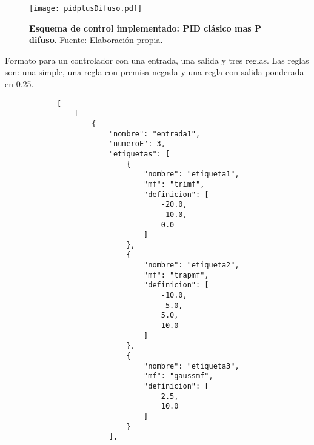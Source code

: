     \vfill

    \begin{figure}[htb]
        \centering
        \texttt{[image: pidplusDifuso.pdf]}
        \caption[Esquema de control implementado: PID clásico más P difuso]{\textbf{Esquema de control implementado: PID clásico mas P difuso}. Fuente: Elaboración propia.} 
        \label{fig:pidplusDifuso}
    \end{figure}
    
    \vfill

    
    \begin{longlisting}
        \caption[Formato para guardar controlador]{Formato para un controlador con una entrada, una salida y tres reglas. Las reglas son: una simple, una regla con premisa negada y una regla con salida ponderada en 0.25.}
        \label{code:anexoE}				
        \begin{verbatim}
            [
                [
                    {
                        "nombre": "entrada1",
                        "numeroE": 3,
                        "etiquetas": [
                            {
                                "nombre": "etiqueta1",
                                "mf": "trimf",
                                "definicion": [
                                    -20.0,
                                    -10.0,
                                    0.0
                                ]
                            },
                            {
                                "nombre": "etiqueta2",
                                "mf": "trapmf",
                                "definicion": [
                                    -10.0,
                                    -5.0,
                                    5.0,
                                    10.0
                                ]
                            },
                            {
                                "nombre": "etiqueta3",
                                "mf": "gaussmf",
                                "definicion": [
                                    2.5,
                                    10.0
                                ]
                            }
                        ],

\end{verbatim}
\end{longlisting}
